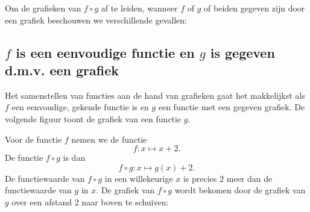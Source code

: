 Om de grafieken van $f\circ g$ af te leiden, wanneer $f$ of $g$ of
beiden gegeven zijn door een grafiek beschouwen we verschillende gevallen:

\subsection{$f$ is een eenvoudige functie en $g$ is gegeven d.m.v.  een grafiek}

Het samenstellen van functies aan de hand van grafieken gaat het
makkelijkst als $f$ een eenvoudige, gekende functie is en $g$ een
functie met een gegeven grafiek. De volgende figuur toont de grafiek
van een functie $g$.

\begin{center}
\end{center}

Voor de functie $f$ nemen we de functie
\[
f:x\mapsto x+2.
\]
De functie $f\circ g$ is dan
\[
f\circ g: x\mapsto g(x)+2.
\]
De functiewaarde van $f\circ g$ in een willekeurige $x$ is precies $2$
meer dan de functiewaarde van $g$ in $x$. De grafiek van $f\circ g$
wordt bekomen door de grafiek van $g$ over een afstand $2$ naar boven
te schuiven:

\begin{center}
\end{center}

